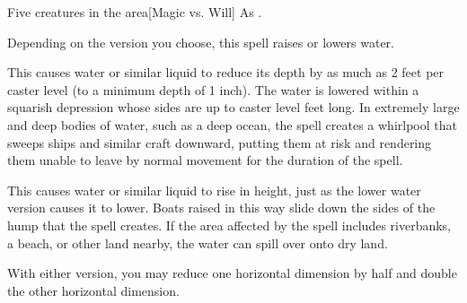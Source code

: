 \begin{spellheader}
    \spellrng{\rngmed}
\end{spellheader}
\begin{spelleffects}
    \begin{spelltarget}{Five creatures in the area}[Magic vs. Will]
        \spellsuccess As .
    \end{spelltarget}
\end{spelleffects}

\begin{spellheader}
    \spelldur{\durmed \dismissable}
\end{spellheader}
\begin{spelleffects}
    \spelleffect Depending on the version you choose, this spell raises or lowers water.
    \par {} This causes water or similar liquid to reduce its depth by as much as 2 feet per caster level (to a minimum depth of 1 inch). The water is lowered within a squarish depression whose sides are up to caster level  feet long. In extremely large and deep bodies of water, such as a deep ocean, the spell creates a whirlpool that sweeps ships and similar craft downward, putting them at risk and rendering them unable to leave by normal movement for the duration of the spell.
    \par {} This causes water or similar liquid to rise in height, just as the lower water version causes it to lower. Boats raised in this way slide down the sides of the hump that the spell creates. If the area affected by the spell includes riverbanks, a beach, or other land nearby, the water can spill over onto dry land.
\end{spelleffects}
\begin{spellfooter}
    \spellnotes With either version, you may reduce one horizontal dimension by half and double the other horizontal dimension.
\end{spellfooter}

